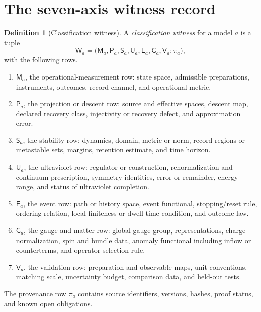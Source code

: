 \documentclass[11pt]{article}
\theoremstyle{definition}
\newtheorem{definition}[theorem]{Definition}
\theoremstyle{remark}
\newcommand{\W}{\mathsf{W}}
\newcommand{\axis}[1]{\mathsf{#1}}
\begin{document}
\section{The seven-axis witness record}
\label{sec:witness}

\begin{definition}[Classification witness]
\label{def:witness}
A \emph{classification witness} for a model \(a\) is a tuple
\[
 \W_a=
 \bigl(
   \axis{M}_a,\axis{P}_a,\axis{S}_a,\axis{U}_a,
   \axis{E}_a,\axis{G}_a,\axis{V}_a;\pi_a
 \bigr),
\]
with the following rows.
\begin{enumerate}[label=\(\axis{\Alph*}\),leftmargin=2.8em]
  \item \(\axis{M}_a\), the operational-measurement row: state space,
  admissible preparations, instruments, outcomes, record channel, and
  operational metric.

  \item \(\axis{P}_a\), the projection or descent row: source and effective
  spaces, descent map, declared recovery class, injectivity or recovery defect,
  and approximation error.

  \item \(\axis{S}_a\), the stability row: dynamics, domain, metric or norm,
  record regions or metastable sets, margins, retention estimate, and time
  horizon.

  \item \(\axis{U}_a\), the ultraviolet row: regulator or construction,
  renormalization and continuum prescription, symmetry identities, error or
  remainder, energy range, and status of ultraviolet completion.

  \item \(\axis{E}_a\), the event row: path or history space, event functional,
  stopping/reset rule, ordering relation, local-finiteness or dwell-time
  condition, and outcome law.

  \item \(\axis{G}_a\), the gauge-and-matter row: global gauge group,
  representations, charge normalization, spin and bundle data, anomaly
  functional including inflow or counterterms, and operator-selection rule.

  \item \(\axis{V}_a\), the validation row: preparation and observable maps,
  unit conventions, matching scale, uncertainty budget, comparison data, and
  held-out tests.
\end{enumerate}
The provenance row \(\pi_a\) contains source identifiers, versions, hashes,
proof status, and known open obligations.
\end{definition}
\end{document}
